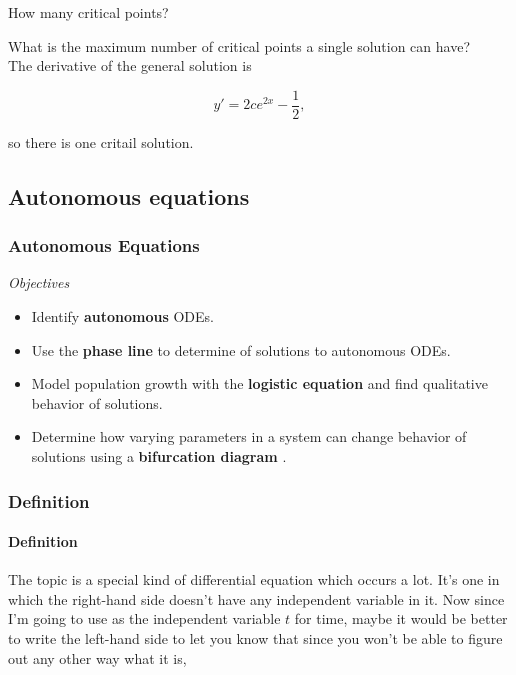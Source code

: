\begin{problem}
  How many critical points? 
\end{problem}

What is the maximum number of critical points a single solution can have? \\

The derivative of the general solution is

\begin{equation*}
  y' = 2 c e^{2x} - \frac{1}{2},  
\end{equation*}

so there is one critail solution.

\clearpage

\subsection{Autonomous equations }

\subsubsection{Autonomous Equations}

\emph{Objectives}
\begin{itemize}
\item Identify  \textbf{\color{blue} autonomous} ODEs.
\item Use the \textbf{\color{blue}phase line} to determine \textbf{\color{stability}} of solutions to autonomous ODEs.
\item Model population growth with the \textbf{\color{blue}logistic equation}
  and find qualitative behavior of solutions.
\item Determine how varying parameters in a system can change behavior of solutions using a
  \textbf{\color{blue} bifurcation diagram }.
\end{itemize}

\clearpage

\subsubsection{Definition}

\paragraph{Definition}
The topic is a special kind of differential equation which occurs a lot.
It's one in which the right-hand side doesn't have
any independent variable in it.
Now since I'm going to use as the independent variable $t$
for time, maybe it would be better to write the left-hand
side to let you know that since you won't be able to figure out
any other way what it is,

